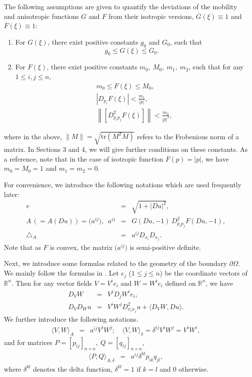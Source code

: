 \documentclass[12pt]{article}
\numberwithin{equation}{section}
\theoremstyle{plain}
\theoremstyle{definition}
\theoremstyle{remark}
\begin{document}
The following assumptions are given to quantify the deviations of the mobility and anisotropic functions 
$G$ and $F$ from their isotropic versions, $\overline{G}(\xi)\equiv 1$ and $\overline{F}(\xi) \equiv 1$:
\begin{enumerate}
\item For $G(\xi)$, there exist positive constants $g_0$ and $G_0$, such that
\begin{equation} \label{eq:cond_mob}
    g_0 \leq G(\xi) \leq G_0.
\end{equation}
\item For $F(\xi)$, there exist positive constants $m_0, \ M_0, \ m_1, \ m_2$, such that for any $1\leq i,j\leq n$, 
\begin{equation} \label{eq:cond_aniso}
\begin{split}
    & m_0  \leq F(\xi) \leq M_0, \\
    & |D_{p_i} F(\xi)|  < \frac{m_1}{|p|}, \\
    & \left\| \left[ D^2_{p_i p_j} F(\xi) \right]\right\|  < \frac{m_2}{|p|^2},
\end{split}
\end{equation}
\end{enumerate}
where in the above, $\|M\|=\sqrt{\text{tr}(M^TM)}$ refers to the Frobenious norm of a matrix.
In Sections 3 and 4, we will give further conditions on these constants. 
As a reference, note that in the case of isotropic function $\overline{F}(p) = |p|$, we have $m_0=M_0=1$ and $m_1 =m_2=0$.

For convenience, we introduce the following notations which are used frequently later:
\begin{eqnarray*}
    v&=&\sqrt{1+|Du|^2},\\
    A \,(=A(Du)) = \big(a^{ij}\big),\,\,\,a^{ij}&=&G(Du,-1) \ D^2_{p_i p_j} F(Du,-1),\\
    \triangle_A&=&a^{ij}D_{x_i} D_{x_j}.
\end{eqnarray*}
Note that as $F$ is convex, the matrix $\big(a^{ij}\big)$ is semi-positive definite. 

Next, we introduce some formulas related to the geometry of the boundary $\partial\Omega$. We mainly follow the
formulas in \cite{AW2}. Let $e_j$ ($1\leq j \leq n$) be the coordinate vectors of $\mathbb{R}^n$.
Then for any vector fields $V = V^ie_i$ and $W = W^ie_i$ defined on $\mathbb{R}^n$, we have
\begin{eqnarray*}
D_VW & = & V^j D_j W^i e_i,\\
    D_V D_W u &=& V^i W^j D^2_{x_i x_j} u + \langle D_V W,Du \rangle.
\end{eqnarray*}
 We further introduce the following notations.
\begin{eqnarray*}
    \langle V,W \rangle_A &=& a^{ij} V^i W^j;\quad \langle V,W \rangle_{\delta} = \delta^{ij} V^i W^j = V^iW^i,
\end{eqnarray*}
and for matrices $P = [p_{ij}]_{n\times n}, \ Q = [q_{ij}]_{n\times n}$, 
\begin{eqnarray*}
    \langle P,Q \rangle_{A,\delta} &=& a^{ij} \delta^{kl} p_{ik} q_{jl},
\end{eqnarray*}
where $\delta^{kl}$ denotes the delta function, $\delta^{kl} = 1$ if $k=l$ and $0$ otherwise.
\end{document}

